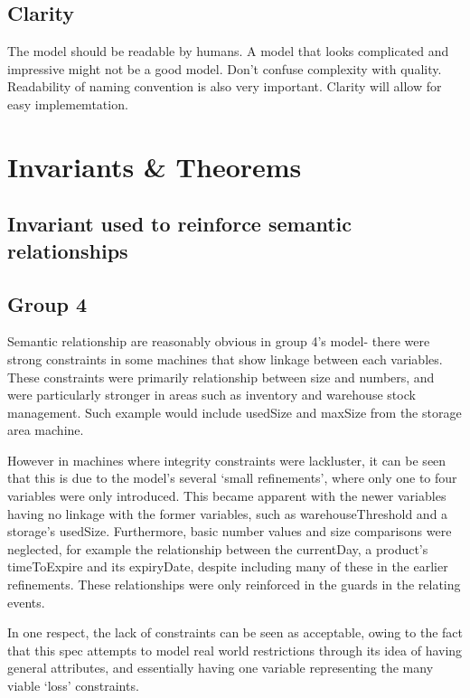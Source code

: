 \subsection{Clarity}
\label{clarity}

The model should be readable by humans. A model that looks complicated and impressive might not be a good model. Don't confuse complexity with quality. Readability of naming convention is also very important. Clarity will allow for easy implememtation.

\section{Invariants \& Theorems}
\label{invariantstheorems}

\subsection{Invariant used to reinforce semantic relationships}
\label{invariantusedtoreinforcesemanticrelationships}

\subsection{Group 4}
\label{group4}

Semantic relationship are reasonably obvious in group 4's model- there were strong constraints in some machines that show linkage between each variables. These constraints were primarily relationship between size and numbers, and were particularly stronger in areas such as inventory and warehouse stock management. Such example would include usedSize and maxSize from the storage area machine.

However in machines where integrity constraints were lackluster, it can be seen that this is due to the model’s several ‘small refinements’, where only one to four variables were only introduced. This became apparent with the newer variables having no linkage with the former variables, such as warehouseThreshold and a storage’s usedSize. Furthermore, basic number values and size comparisons were neglected, for example the relationship between the currentDay, a product’s timeToExpire and its expiryDate, despite including many of these in the earlier refinements. These relationships were only reinforced in the guards in the relating events.

In one respect, the lack of constraints can be seen as acceptable, owing to the fact that this spec attempts to model real world restrictions through its idea of having general attributes, and essentially having one variable representing the many viable ‘loss’ constraints. 

